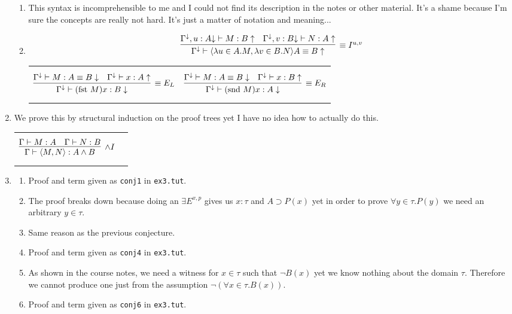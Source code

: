 \documentclass{article}
\newcommand{\fst}{\text{fst }}
\newcommand{\snd}{\text{snd }}
\begin{document}
\begin{enumerate}[label=\textbf{Exercise \arabic*}]
\begin{enumerate}[label=\textbf{Task \arabic*},leftmargin=1em]
\item This syntax is incomprehensible to me and I could not find its description in the notes or other material. It's a shame because I'm sure the concepts are really not hard. It's just a matter of notation and meaning...
\item 
\[
\infer[\equiv I^{u,v}]
  {\Gamma^\downarrow \vdash \langle \lambda u \in A.M,\lambda v \in B.N \rangle A \equiv B \uparrow}
  {\Gamma^\downarrow, u:A {\downarrow} \vdash M:B \uparrow
  &\Gamma^\downarrow, v:B {\downarrow} \vdash N:A \uparrow}
\]
\begin{tabular}{cc}
$$
\infer[\equiv E_L]
  { \Gamma^\downarrow \vdash (\fst M) x : B \downarrow }
  { \Gamma^\downarrow \vdash M:A \equiv B \downarrow
  & \Gamma^\downarrow \vdash x : A \uparrow }
$$
&
$$
\infer[\equiv E_R]
  { \Gamma^\downarrow \vdash (\snd M) x : A \downarrow }
  { \Gamma^\downarrow \vdash M:A \equiv B \downarrow
  & \Gamma^\downarrow \vdash x : B \uparrow }
$$
\end{tabular}

\end{enumerate}

\item We prove this by structural induction on the proof trees yet I have no idea how to actually do this.

\begin{tabular}{cc}
$$
\infer[\land I]
  {\Gamma \vdash \langle M,N \rangle : A\land B}
  {\Gamma \vdash M:A & \Gamma \vdash N:B}
$$
&$$
$$
\end{tabular}

\item

\begin{enumerate}[label=\arabic*.,leftmargin=1em]
\item Proof and term given as \texttt{conj1} in \texttt{ex3.tut}.
\item The proof breaks down because doing an $\exists E^{x,p}$ gives us $x:\tau$ and $A\supset P(x)$ yet in order to prove $\forall y\in\tau.P(y)$ we need an arbitrary $y\in\tau$.
\item Same reason as the previous conjecture.
\item Proof and term given as \texttt{conj4} in \texttt{ex3.tut}.
\item As shown in the course notes, we need a witness for $x\in\tau$ such that $\neg B(x)$ yet we know nothing about the domain $\tau$. Therefore we cannot produce one just from the assumption $\neg(\forall x\in\tau.B(x))$.
\item Proof and term given as \texttt{conj6} in \texttt{ex3.tut}.
\end{enumerate}


\end{enumerate}
\end{document}
